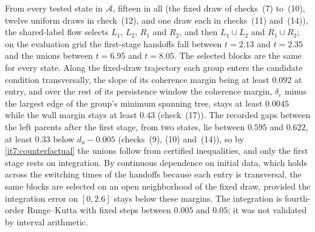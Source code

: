 \documentclass[11pt,letterpaper]{report}
\begin{document}
From every tested state in $\mathcal A$, fifteen in all (the fixed draw of checks~(7) to~(10), twelve uniform draws in check~(12), and one draw each in checks~(11) and~(14)), the shared-label flow selects $L_1$, $L_2$, $R_1$ and $R_2$, and then $L_1\cup L_2$ and $R_1\cup R_2$; on the evaluation grid the first-stage handoffs fall between $t=2.13$ and $t=2.35$ and the unions between $t=6.95$ and $t=8.05$. The selected blocks are the same for every state. Along the fixed-draw trajectory each group enters the candidate condition transversally, the slope of its coherence margin being at least $0.092$ at entry, and over the rest of its persistence window the coherence margin, $\delta_c$ minus the largest edge of the group's minimum spanning tree, stays at least $0.0045$ while the wall margin stays at least $0.43$ (check~(17)). The recorded gaps between the left parents after the first stage, from two states, lie between $0.595$ and $0.622$, at least $0.33$ below $d_u-0.005$ (checks~(9), (10) and~(14)), so by \cref{it7:counterfactual} the unions follow from certified inequalities, and only the first stage rests on integration. By continuous dependence on initial data, which holds across the switching times of the handoffs because each entry is transversal, the same blocks are selected on an open neighborhood of the fixed draw, provided the integration error on $[0,2.6]$ stays below these margins. The integration is fourth-order Runge--Kutta with fixed steps between $0.005$ and $0.05$; it was not validated by interval arithmetic.
\end{document}
